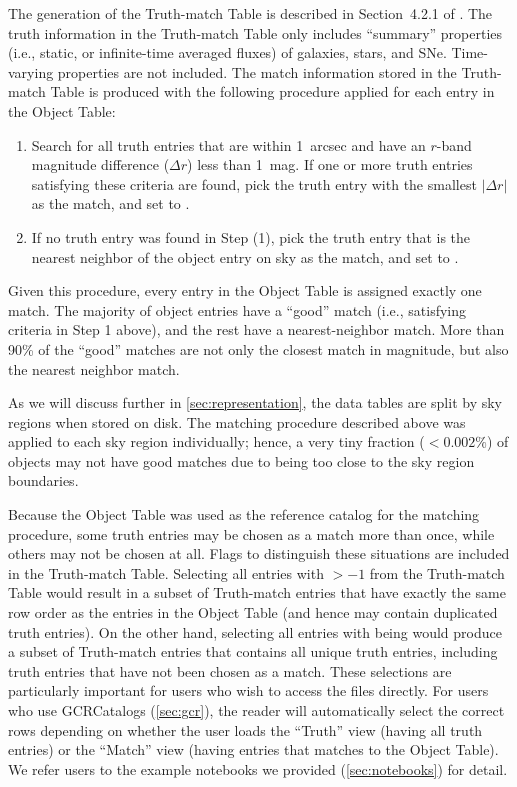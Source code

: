 \documentclass[modern]{descnote}
\begin{document}
The generation of the Truth-match Table is described in Section~4.2.1 of \cite{2020arXiv201005926L}. The truth information in the Truth-match Table only includes ``summary'' properties (i.e., static, or infinite-time averaged fluxes) of galaxies, stars, and SNe. Time-varying properties are not included. The match information stored in the  Truth-match Table is produced with the following procedure applied for each entry in the Object Table:
\begin{enumerate}
    \item Search for all truth entries that are within 1~arcsec and have an $r$-band magnitude difference ($\Delta r$) less than 1~mag. If one or more truth entries satisfying these criteria are found, pick the truth entry with the smallest $|\Delta r|$ as the match, and set  to .
    \item If no truth entry was found in Step (1), pick the truth entry that is the nearest neighbor of the object entry on sky as the match, and set  to .
\end{enumerate}
Given this procedure, every entry in the Object Table is assigned exactly one match. The majority of object entries have a ``good'' match (i.e., satisfying criteria in Step 1 above), and the rest have a nearest-neighbor match. More than 90\% of the ``good'' matches are not only the closest match in magnitude, but also the nearest neighbor match. 

As we will discuss further in \autoref{sec:representation}, the data tables are split by sky regions when stored on disk. The matching procedure described above was applied to each sky region individually; hence, a very tiny fraction ($<0.002\%$) of objects may not have good matches due to being too close to the sky region boundaries. 

Because the Object Table was used as the reference catalog for the matching procedure, some truth entries may be chosen as a match more than once, while others may not be chosen at all.
Flags to distinguish these situations are included in the Truth-match Table. 
Selecting all entries with  $> -1$ from the Truth-match Table would result in a subset of Truth-match entries that have exactly the same row order as the entries in the Object Table (and hence may contain duplicated truth entries). On the other hand, selecting all entries with  being  would produce a subset of Truth-match entries that contains all unique truth entries, including truth entries that have not been chosen as a match.
These selections are particularly important for users who wish to access the files directly. For users who use GCRCatalogs (\autoref{sec:gcr}), the reader will automatically select the correct rows depending on whether the user loads the ``Truth'' view (having all truth entries) or the ``Match'' view (having entries that matches to the Object Table). We refer users to the example notebooks we provided (\autoref{sec:notebooks}) for detail.
\end{document}
